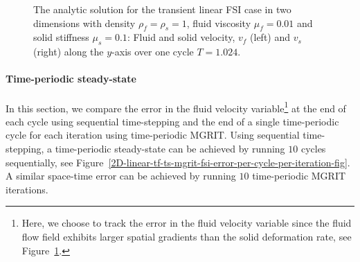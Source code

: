 \documentclass[3p]{elsarticle}
\begin{document}
\begin{figure}[ht!]
\begin{minipage}{\textwidth}
\begin{minipage}{0.485\textwidth}
        \end{minipage}
        \vfill
    \end{minipage}
    \caption{The analytic solution for the transient linear FSI case in two dimensions
        with density $\rho_f = \rho_s = 1$, fluid viscosity $\mu_f = 0.01$ and solid stiffness $\mu_s = 0.1$:
        Fluid and solid velocity, $v_f$ (left) and $v_s$ (right)
        along the $y$-axis over one cycle $T = 1.024$.}
    \label{2D-linear-tf-ts-solution-along-y-fig}
\end{figure}
\paragraph{Time-periodic steady-state}
In this section, we compare the error in the fluid velocity variable\footnote{Here,
we choose to track the error in the fluid velocity variable
since the fluid flow field exhibits larger spatial gradients than the solid deformation rate,
see Figure~\ref{2D-linear-tf-ts-solution-along-y-fig}.}
at the end of each cycle using sequential time-stepping
and the end of a single time-periodic cycle for each iteration using time-periodic MGRIT.
Using sequential time-stepping, a time-periodic steady-state can be achieved
by running $10$ cycles sequentially,
see Figure~\ref{2D-linear-tf-ts-mgrit-fsi-error-per-cycle-per-iteration-fig}.
A similar space-time error can be achieved by running $10$ time-periodic MGRIT iterations.
\end{document}
